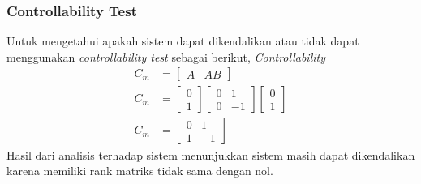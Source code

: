 \documentclass[../main.tex]{subfiles}
\begin{document}
            \subsubsection{Controllability Test}
                Untuk mengetahui apakah sistem dapat dikendalikan atau tidak dapat menggunakan \textit{controllability test} sebagai berikut,
                \textit{Controllability}
                \begin{equation}
                    \begin{split}
                        C_m &= \begin{bmatrix} A & AB \end{bmatrix} \\[5pt]
                        C_m &= \begin{bmatrix} 0 \\ 1 \end{bmatrix} \begin{bmatrix} 0 & 1 \\ 0 & -1\end{bmatrix} \begin{bmatrix}0 \\ 1 \end{bmatrix} \\[5pt]
                        C_m &= \begin{bmatrix} 0 & 1 \\ 1 & -1
                        \end{bmatrix}
                        \label{persamaan_11}
                    \end{split}
                \end{equation}
                Hasil dari analisis terhadap sistem menunjukkan sistem masih dapat dikendalikan karena memiliki rank matriks tidak sama dengan nol.
\end{document}
